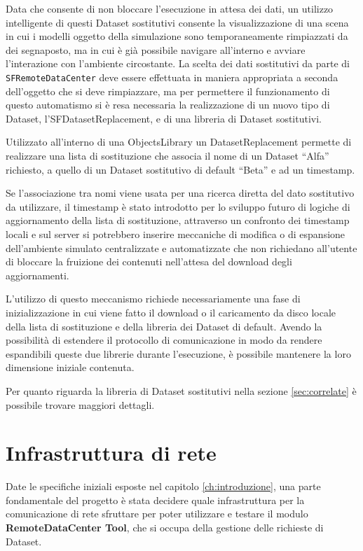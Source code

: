 Data che consente di non bloccare l'esecuzione in attesa dei dati, un utilizzo intelligente di questi Dataset sostitutivi consente la visualizzazione di una scena in cui i modelli oggetto della simulazione sono temporaneamente rimpiazzati da dei segnaposto, ma in cui \`e gi\`a possibile navigare all'interno e avviare l'interazione con l'ambiente circostante. La scelta dei dati sostitutivi da parte di \texttt{SFRemoteDataCenter} deve essere effettuata in maniera appropriata a seconda dell'oggetto che si deve rimpiazzare, ma per permettere il funzionamento di questo automatismo si \`e resa necessaria la realizzazione di un nuovo tipo di Dataset, l'SFDatasetReplacement, e di una libreria di Dataset sostitutivi.

Utilizzato all'interno di una ObjectsLibrary un DatasetReplacement permette di realizzare una lista di sostituzione che associa il nome di un Dataset ``Alfa'' richiesto, a quello di un Dataset sostitutivo di default ``Beta'' e ad un timestamp.

Se l'associazione tra nomi viene usata per una ricerca diretta del dato sostitutivo da utilizzare, il timestamp \`e stato introdotto per lo sviluppo futuro di logiche di aggiornamento della lista di sostituzione, attraverso un confronto dei timestamp locali e sul server si potrebbero inserire meccaniche di modifica o di espansione dell'ambiente simulato centralizzate e automatizzate che non richiedano all'utente di bloccare la fruizione dei contenuti nell'attesa del download degli aggiornamenti.

L'utilizzo di questo meccanismo richiede necessariamente una fase di inizializzazione in cui viene fatto il download o il caricamento da disco locale della lista di sostituzione e della libreria dei Dataset di default. Avendo la possibilit\`a di estendere il protocollo di comunicazione in modo da rendere espandibili queste due librerie durante l'esecuzione, \`e possibile mantenere la loro dimensione iniziale contenuta.

Per quanto riguarda la libreria di Dataset sostitutivi nella sezione \ref{sec:correlate} \`e possibile trovare maggiori dettagli.

\section{Infrastruttura di rete} 
\label{sec:rete}
Date le specifiche iniziali esposte nel capitolo \ref{ch:introduzione}, una parte fondamentale del progetto \`e stata decidere quale infrastruttura per la comunicazione di rete sfruttare per poter utilizzare e testare il modulo \textbf{RemoteDataCenter Tool}, che si occupa della gestione delle richieste di Dataset.

